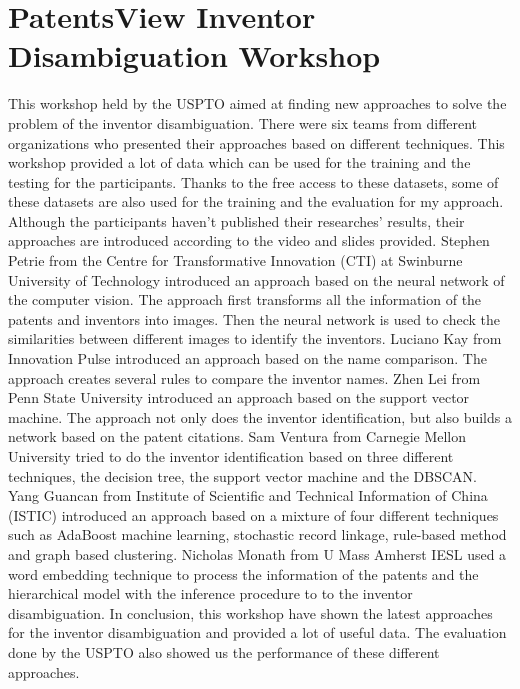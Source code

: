 \section{PatentsView Inventor Disambiguation Workshop}
This workshop held by the USPTO aimed at finding new approaches to solve the problem of the inventor disambiguation. There were six teams from different organizations who presented their approaches based on different techniques. This workshop provided a lot of data which can be used for the training and the testing for the participants. Thanks to the free access to these datasets, some of these datasets are also used for the training and the evaluation for my approach. Although the participants haven't published their researches' results,  their approaches are introduced according to the video and slides provided. Stephen Petrie from the Centre for Transformative Innovation (CTI) at Swinburne University of Technology introduced an approach based on the neural network of the computer vision. The approach first transforms all the information of the patents and inventors into images. Then the neural network is used to check the similarities between different images to identify the inventors.  Luciano Kay from Innovation Pulse introduced an approach based on the name comparison. The approach creates several rules to compare the inventor names. Zhen Lei from Penn State University introduced an approach based on the support vector machine. The approach not only does the inventor identification, but also builds a network based on the patent citations. Sam Ventura from Carnegie Mellon University tried to do the inventor identification based on three different techniques, the decision tree, the support vector machine and the DBSCAN.  Yang Guancan from Institute of Scientific and Technical Information of China (ISTIC) introduced an approach based on a mixture of four different techniques such as AdaBoost machine learning, stochastic record linkage, rule-based method and graph based clustering. Nicholas Monath from U Mass Amherst IESL used a word embedding technique to process the information of the patents and the hierarchical model with the inference procedure to to the inventor disambiguation. In conclusion, this workshop have shown the latest approaches for the inventor disambiguation and provided a lot of useful data. The evaluation done by the USPTO also showed us the performance of these different approaches.
